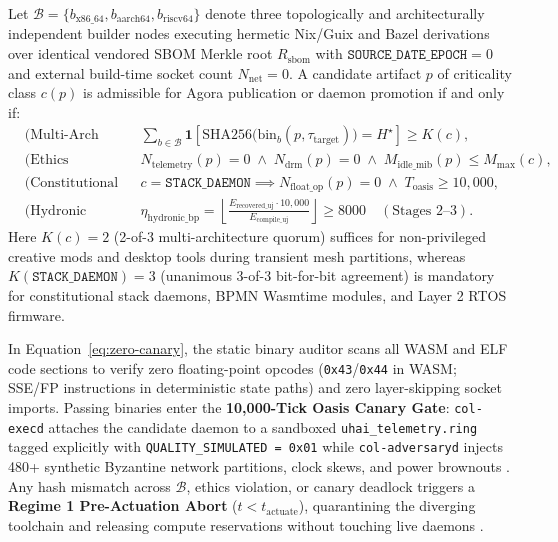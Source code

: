 \begin{invariant}
\label{inv:zero-forge}
Let $\mathcal{B} = \{b_{\mathrm{x86\_64}}, b_{\mathrm{aarch64}}, b_{\mathrm{riscv64}}\}$ denote three topologically
and architecturally independent builder nodes executing hermetic Nix/Guix and Bazel derivations over identical vendored
SBOM Merkle root $R_{\mathrm{sbom}}$ with $\mathtt{SOURCE\_DATE\_EPOCH} = 0$ and external build-time socket count
$N_{\mathrm{net}} = 0$. A candidate artifact $p$ of criticality class $c(p)$ is admissible for Agora publication or
daemon promotion if and only if:
{\footnotesize
\begin{align}
    &\text{(Multi-Arch Consensus)} && \sum_{b \in \mathcal{B}} \mathbf{1}\!\left[\mathrm{SHA256}\big(\mathrm{bin}_{b}(p, \tau_{\mathrm{target}})\big) = H^{\star}\right] \ge K(c), \label{eq:zero-consensus}\\
    &\text{(Ethics \& Frugality)} && N_{\mathrm{telemetry}}(p) = 0 \;\land\; N_{\mathrm{drm}}(p) = 0 \;\land\; M_{\mathrm{idle\_mib}}(p) \le M_{\max}(c), \label{eq:zero-ethics}\\
    &\text{(Constitutional Canary)} && c = \mathtt{STACK\_DAEMON} \implies N_{\mathrm{float\_op}}(p) = 0 \;\land\; T_{\mathrm{oasis}} \ge 10{,}000, \label{eq:zero-canary}\\
    &\text{(Hydronic Recovery)} && \eta_{\mathrm{hydronic\_bp}} = \left\lfloor \frac{E_{\mathrm{recovered\_uj}} \cdot 10{,}000}{E_{\mathrm{compile\_uj}}} \right\rfloor \ge 8000 \quad (\text{Stages 2--3}). \label{eq:zero-heat}
\end{align}
}
Here $K(c) = 2$ (2-of-3 multi-architecture quorum) suffices for non-privileged creative mods and desktop tools during
transient mesh partitions, whereas $K(\mathtt{STACK\_DAEMON}) = 3$ (unanimous 3-of-3 bit-for-bit agreement) is
mandatory for constitutional stack daemons, BPMN Wasmtime modules, and Layer 2 RTOS firmware.
\end{invariant}

In Equation~\eqref{eq:zero-canary}, the static binary auditor scans all WASM and ELF code sections to verify zero
floating-point opcodes (\texttt{0x43}/\texttt{0x44} in WASM; SSE/FP instructions in deterministic state paths) and zero
layer-skipping socket imports. Passing binaries enter the \textbf{10,000-Tick Oasis Canary Gate}: \texttt{col-execd}
attaches the candidate daemon to a sandboxed \texttt{uhai\_telemetry.ring} tagged explicitly with
\texttt{QUALITY\_SIMULATED = 0x01} while \texttt{col-adversaryd} injects 480+ synthetic Byzantine network partitions,
clock skews, and power brownouts \parencite{grieves2014digital}. Any hash mismatch across $\mathcal{B}$, ethics
violation, or canary deadlock triggers a \textbf{Regime 1 Pre-Actuation Abort} ($t < t_{\mathrm{actuate}}$),
quarantining the diverging toolchain and releasing compute reservations without touching live daemons
\parencite{garciamolina1987sagas}.

